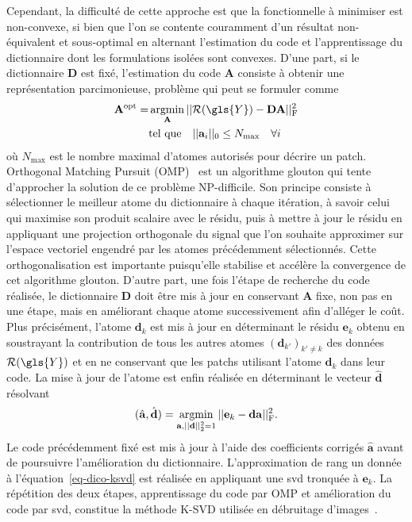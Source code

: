 %
Cependant, la difficulté de cette approche est que la fonctionnelle à minimiser est non-convexe, si bien que l'on se contente couramment d'un résultat non-équivalent et sous-optimal en alternant l'estimation du code et l'apprentissage du dictionnaire dont les formulations isolées sont convexes.
%
D'une part, si le dictionnaire $\mathbf{D}$ est fixé, l'estimation du code $\mathbf{A}$ consiste à obtenir une représentation parcimonieuse, problème qui peut se formuler comme
\begin{align}
    \mathbf{A}^{\mathrm{opt}} = &\argmin_{\mathbf{A}} \frobnorm{ \mathcal{R}(\gls{Y}) - \mathbf{DA}}\\
    &\text{tel que}
    \quad
    ||\mathbf{a}_i||_0 \leq N_{\mathrm{max}}\quad\forall i
\end{align}
où $N_{\mathrm{max}}$ est le nombre maximal d'atomes autorisés pour décrire un patch. Orthogonal Matching Pursuit (OMP)~\cite{mallat1993matching, pati1993orthogonal} est un algorithme glouton qui tente d'approcher la solution de ce problème NP-difficile. Son principe consiste à sélectionner le meilleur atome du dictionnaire à chaque itération, à savoir celui qui maximise son produit scalaire avec le résidu, puis à mettre à jour le résidu en appliquant une projection orthogonale du signal que l'on souhaite approximer sur l'espace vectoriel engendré par les atomes précédemment sélectionnés. Cette orthogonalisation est importante puisqu'elle stabilise et accélère la convergence de cet algorithme glouton.
%
D'autre part, une fois l'étape de recherche du code réalisée, le dictionnaire $\mathbf{D}$ doit être mis à jour en conservant $\mathbf{A}$ fixe, non pas en une étape, mais en améliorant chaque atome successivement afin d'alléger le coût. Plus précisément, l'atome $\mathbf{d}_k$ est mis à jour en déterminant le résidu $\mathbf{e}_k$ obtenu en soustrayant la contribution de tous les autres atomes $(\mathbf{d}_{k'})_{k'\neq k}$  des données $\mathcal{R}(\gls{Y})$ et en ne conservant que les patchs utilisant l'atome $\mathbf{d}_k$ dans leur code. La mise à jour de l'atome est enfin réalisée en déterminant le vecteur $\hat{\mathbf{d}}$ résolvant
\begin{equation}\label{eq-dico-ksvd}
    (\hat{\mathbf{a}}, \hat{\mathbf{d}}) = \argmin_{\mathbf{a}, \twonorm{\mathbf{d}}=1} \frobnorm{\mathbf{e}_k-\mathbf{da}}.
\end{equation}
Le code précédemment fixé est mis à jour à l'aide des coefficients corrigés $\hat{\mathbf{a}}$ avant de poursuivre l'amélioration du dictionnaire. L'approximation de rang un donnée à l'équation~\eqref{eq-dico-ksvd} est réalisée en appliquant une \gls{svd} tronquée à $\mathbf{e}_k$. La répétition des deux étapes, apprentissage du code par OMP et amélioration du code par \gls{svd}, constitue la méthode K-SVD utilisée en débruitage d'images~\cite{elad2006image}.

